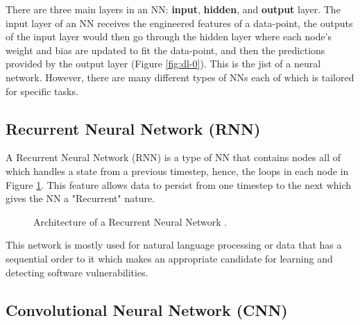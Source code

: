 \documentclass[12pt,twocolumn,letterpaper]{article}
\begin{document}
There are three main layers in an NN: \textbf{input}, \textbf{hidden}, and \textbf{output} layer. 
The input layer of an NN receives the engineered features of a data-point, the outputs of the input layer would
then go through the hidden layer where each node's weight and bias are updated to fit the data-point, and 
then the predictions provided by the output layer (Figure \ref{fig:dl-0}). This is the jist of a 
neural network. However, there are many different types of NNs each of which is tailored for specific 
tasks.

\subsection{Recurrent Neural Network (RNN)}
\label{sub:recurrent-neural-network}

A Recurrent Neural Network (RNN) is a type of NN that contains nodes all of which handles a state from a 
previous timestep, hence, the loops in each node in Figure \ref{fig:dl-1}. This feature allows data to 
persist from one timestep to the next which gives the NN a "Recurrent" nature.

\begin{figure}[h]
    \centering
    \caption{Architecture of a Recurrent Neural Network \cite{Lin20}.}
    \label{fig:dl-1}
\end{figure}

This network is mostly used for natural language processing or data that has a sequential order to it which 
makes an appropriate candidate for learning and detecting software vulnerabilities. 

\subsection{Convolutional Neural Network (CNN)}
\label{sub:convolutional-neural-network}
\end{document}
